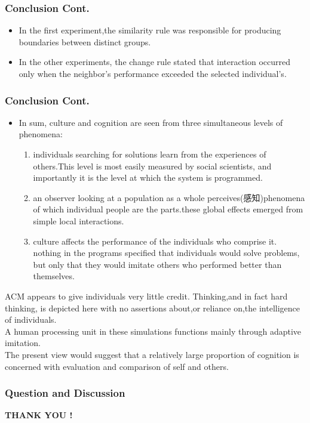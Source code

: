 \documentclass[CJK]{beamer}
\begin{document}
\begin{CJK*}{GBK}{song}
\begin{frame}
\frametitle{Conclusion Cont.}
\begin{itemize}
\item{In the first experiment,the similarity rule was responsible for producing boundaries between distinct groups.}
\item{In the other experiments, the change rule stated that interaction occurred only when the neighbor's performance exceeded the selected individual's.}
\end{itemize}
\end{frame}

\begin{frame}
\frametitle{Conclusion Cont.}
\begin{itemize}
\item{In sum, culture and cognition are seen from three simultaneous levels of phenomena:}
\begin{enumerate}
\item{individuals searching for solutions learn from the experiences of others.This level is most easily measured by social scientists, and importantly it is the level at which the system is programmed.}
\item{an observer looking at a population as a whole perceives(感知)phenomena of which individual people are the parts.these global effects emerged from simple local interactions.}
\item{culture affects the performance of the individuals who comprise it. nothing  in  the  programs  specified  that  individuals would solve problems, but only that they would imitate others who performed better than themselves.}
\end{enumerate}
\end{itemize}
\end{frame}

\begin{frame}
ACM appears to give individuals very little credit. Thinking,and in fact hard thinking, is depicted here with no assertions about,or reliance on,the intelligence of individuals.\\
A human processing unit in these simulations functions mainly through adaptive imitation.\\
The present view would suggest that a relatively large proportion of cognition is concerned with evaluation and comparison of self and others.
\end{frame}
\begin{frame}
\frametitle{Question and Discussion}
\begin{center}
{\LARGE \textbf{THANK YOU !}}\\
\end{center}
\end{frame}

\end{CJK*}
\end{document}
